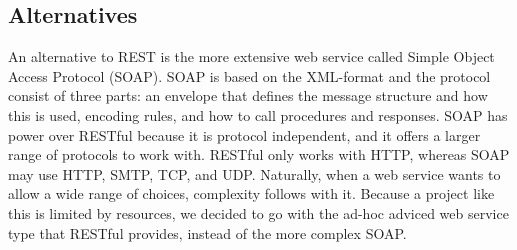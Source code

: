 \subsection{Alternatives}
\label{subsec:restAlt}
An alternative to REST is the more extensive web service called Simple Object Access Protocol (SOAP). SOAP is based on the XML-format and the protocol consist of three parts: an envelope that defines the message structure and how this is used, encoding rules, and how to call procedures and responses\cite{DecidingOnRESTful}. SOAP has power over RESTful because it is protocol independent, and it offers a larger range of protocols to work with. RESTful only works with HTTP, whereas SOAP may use HTTP, SMTP, TCP, and UDP. Naturally, when a web service wants to allow a wide range of choices, complexity follows with it. Because a project like this is limited by resources, we decided to go with the ad-hoc adviced web service type that RESTful provides, instead of the more complex SOAP\cite{DecidingOnRESTful}.